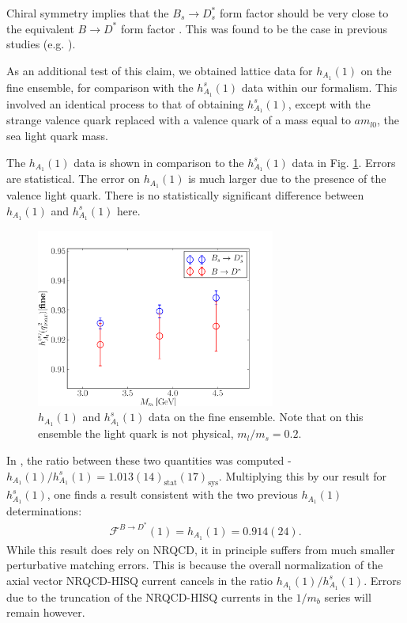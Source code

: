 Chiral symmetry implies that the $B_s\to D_s^*$ form factor should be very close to the equivalent $B\to D^*$ form factor \cite{Laiho:2005ue}. This was found to be the case in previous studies (e.g. \cite{Harrison:2017fmw}). 

As an additional test of this claim, we obtained lattice data for $h_{A_1}(1)$ on the fine ensemble, for comparison with the $h_{A_1}^s(1)$ data within our formalism. This involved an identical process to that of obtaining $h_{A_1}^s(1)$, except with the strange valence quark replaced with a valence quark of a mass equal to $am_{l0}$, the sea light quark mass.

The $h_{A_1}(1)$ data is shown in comparison to the $h_{A_1}^s(1)$ data in Fig. \ref{fig:BDstar_BsDsstar}. Errors are statistical. The error on $h_{A_1}(1)$ is much larger due to the presence of the valence light quark. There is no statistically significant difference between $h_{A_1}(1)$ and $h_{A_1}^s(1)$ here.

\begin{figure}[htb!]
  \begin{center}
  \hspace{-10pt}
  \includegraphics[width=0.7\textwidth]{images/BsDsstar/BD_BsDs.pdf}
  \caption{$h_{A_1}(1)$ and $h_{A_1}^s(1)$ data on the fine ensemble. Note that on this ensemble the light quark is not physical, $m_l/m_s=0.2$. \label{fig:BDstar_BsDsstar}}
  \end{center}
\end{figure}

In \cite{Harrison:2017fmw}, the ratio between these two quantities was computed - $h_{A_1}(1) / h^s_{A_1}(1) = 1.013(14)_{\text{stat}}(17)_{\text{sys}}$. Multiplying this by our result for $h^s_{A_1}(1)$, one finds a result consistent with the two previous $h_{A_1}(1)$ determinations:
\begin{align}
  \mathcal{F}^{B\to D^*}(1) = h_{A_1}(1) = 0.914(24).
  \label{eq:hA1_us_nrqcd}
\end{align}
While this result does rely on NRQCD, it in principle suffers from much smaller perturbative matching errors. This is because the overall normalization of the axial vector NRQCD-HISQ current cancels in the ratio $h_{A_1}(1) / h^s_{A_1}(1)$. Errors due to the truncation of the NRQCD-HISQ currents in the $1/m_b$ series will remain however.

